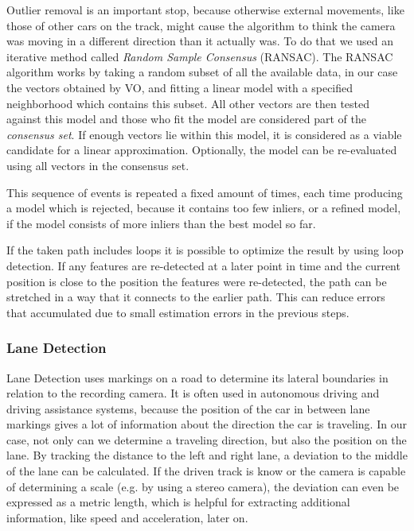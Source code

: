 Outlier removal is an important stop, because otherwise external movements, like those of other cars on the track, might cause the algorithm to think the camera was moving in a different direction than it actually was.
To do that we used an iterative method called \textit{Random Sample Consensus} (RANSAC). 
The RANSAC algorithm works by taking a random subset of all the available data, in our case the vectors obtained by VO, and fitting a linear model with a specified neighborhood which contains this subset. All other vectors are then tested against this model and those who fit the model are considered part of the \textit{consensus set}.
If enough vectors lie within this model, it is considered as a viable candidate for a linear approximation. Optionally, the model can be re-evaluated using all vectors in the consensus set.

This sequence of events is repeated a fixed amount of times, each time producing a model which is rejected, because it contains too few inliers, or a refined model, if the model consists of more inliers than the best model so far.

If the taken path includes loops it is possible to optimize the result by using loop detection. If any features are re-detected at a later point in time and the current position is close to the position the features were re-detected, the path can be stretched in a way that it connects to the earlier path.
This can reduce errors that accumulated due to small estimation errors in the previous steps.


\subsubsection{Lane Detection}
Lane Detection uses markings on a road to determine its lateral boundaries in relation to the recording camera. It is often used in autonomous driving and driving assistance systems, because the position of the car in between lane markings gives a lot of information about the direction the car is traveling. 
In our case, not only can we determine a traveling direction, but also the position on the lane.
By tracking the distance to the left and right lane, a deviation to the middle of the lane can be calculated. 
If the driven track is know or the camera is capable of determining a scale (e.g. by using a stereo camera), the deviation can even be expressed as a metric length, which is helpful for extracting additional information, like speed and acceleration, later on.


